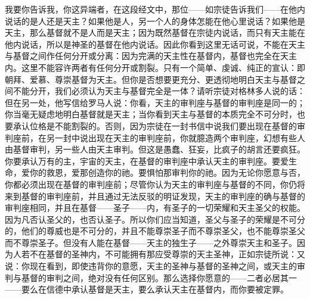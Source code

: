 我要你告诉我，你这异端者，在这段经文中，那位——如宗徒告诉我们——在他内说话的是人还是天主？如果他是人，另一个人的身体怎能在他心里说话？如果他是天主，那么基督就不是人而是天主；因为既然基督在宗徒内说话，而只有天主能在他内说话，所以是神圣的基督在他内说话。因此你看到这里无话可说，不能在天主与基督之间作任何分开或分离：因为完满的天主性在基督内，基督也完全在天主内。这里不能容许两者有任何分开或割裂。只有一个简单、虔诚、纯正的宣认：即朝拜、爱慕、尊崇基督为天主。但你是否想要更充分、更透彻地明白天主与基督之间不能分开，我们必须认为天主与基督完全是一体？请听宗徒对格林多人说的话：但在另一处，他写信给罗马人说：你看，天主的审判座与基督的审判座是同一的；你当毫无疑虑地明白基督就是天主；当你看到天主与基督的本质完全不可分时，也要承认位格是不能割裂的。否则，因为宗徒在一封书信中说我们要出现在基督的审判座前，在另一封中说出现在天主的审判座前，你就臆造两个审判座，幻想有些人由基督审判，另一些人由天主审判。但这是愚蠢、狂妄，比疯子的胡言还要疯狂。你要承认万有的主，宇宙的天主，在基督的审判座中承认天主的审判座。要爱生命，爱你的救恩，爱那创造你的祂。要惧怕那审判你的祂。因为无论你愿意与否，你都必须出现在基督的审判座前；尽管你认为天主的审判座与基督的不同，你仍将来到基督的审判座前，并且通过无法反驳的明证发现，天主的审判座的确与基督的审判座相同，并且在基督——圣子——内，有圣子的一切荣耀和天主圣父的权能。因为凡否认圣父的，也否认圣子。所以你们应当知道，圣父与圣子的荣耀是不可分的，他们的尊威也是不可分的，并且不能尊崇圣子而不尊崇圣父，也不能尊崇圣父而不尊崇圣子。但没有人能在基督——天主的独生子——之外尊崇天主和圣子。因为人若不在基督的圣神内，不可能拥有那应受尊崇的天主圣神，正如宗徒所说：又说：你现在看到，即使违背你的意愿，天主的圣神与基督的圣神之间，或天主的审判与基督的审判之间，绝对没有任何区别。那么选择你愿意的——二者必居其一——要么在信德中承认基督是天主，要么承认天主在基督内，而你要被定罪。\par


